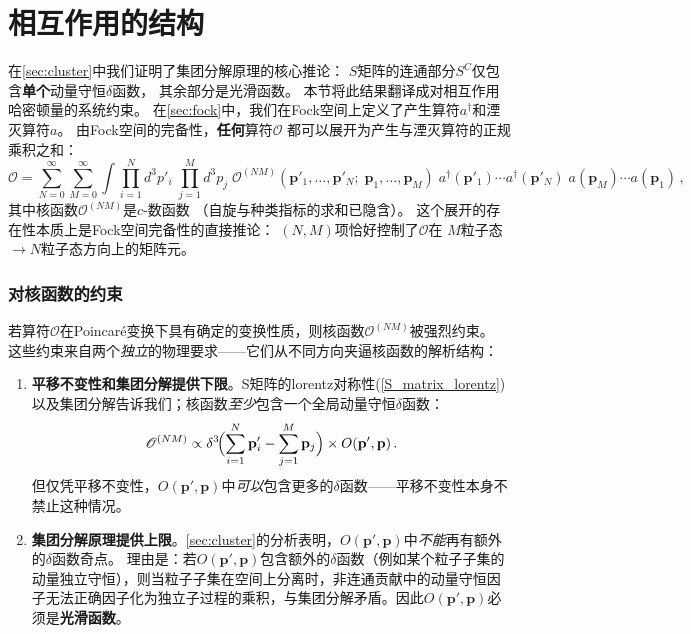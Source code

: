 \section{相互作用的结构}\label{sec:interaction-structure}

在\ref{sec:cluster}中我们证明了集团分解原理的核心推论：
$S$矩阵的连通部分$S^C$仅包含\textbf{单个}动量守恒$\delta$函数，
其余部分是光滑函数。
本节将此结果翻译成对相互作用哈密顿量的系统约束。
在\ref{sec:fock}中，我们在Fock空间上定义了产生算符$a^\dagger$和湮灭算符$a$。
由Fock空间的完备性，\textbf{任何}算符$\mathscr{O}$
都可以展开为产生与湮灭算符的正规乘积之和：
\begin{equation}\label{eq:opexpand}
\mathscr{O} = \sum_{N=0}^{\infty}\sum_{M=0}^{\infty}
\int\prod_{i=1}^{N}d^3p'_i\;\prod_{j=1}^{M}d^3p_j\;
\mathscr{O}^{(NM)}(\boldsymbol{p}'_1,\ldots,\boldsymbol{p}'_N;\;
\boldsymbol{p}_1,\ldots,\boldsymbol{p}_M)\;
a^\dagger(\boldsymbol{p}'_1)\cdots a^\dagger(\boldsymbol{p}'_N)\;
a(\boldsymbol{p}_M)\cdots a(\boldsymbol{p}_1)\,,
\end{equation}
其中核函数$\mathscr{O}^{(NM)}$是$c$-数函数
（自旋与种类指标的求和已隐含）。
这个展开的存在性本质上是Fock空间完备性的直接推论：
$(N,M)$项恰好控制了$\mathscr{O}$在
$M$粒子态$\to N$粒子态方向上的矩阵元。


\subsubsection*{对核函数的约束}

若算符$\mathscr{O}$在Poincar\'e变换下具有确定的变换性质，则核函数$\mathscr{O}^{(NM)}$被强烈约束。
这些约束来自两个\emph{独立}的物理要求——它们从不同方向夹逼核函数的解析结构：

\begin{enumerate}
    \item \textbf{平移不变性和集团分解提供下限}。S矩阵的lorentz对称性(\ref{S_matrix_lorentz})以及集团分解告诉我们；核函数\emph{至少}包含一个全局动量守恒$\delta$函数：
    \begin{equation}\label{eq:single-delta}
        \mathscr{O}^{(NM)} \propto \delta^3\!\Bigl(\sum_{i=1}^{N}\mathbf{p}_i' - \sum_{j=1}^{M}\mathbf{p}_j\Bigr)
        \times O(\mathbf{p}',\mathbf{p})\,.
    \end{equation}
    但仅凭平移不变性，$O(\mathbf{p}',\mathbf{p})$中\emph{可以}包含更多的$\delta$函数——平移不变性本身不禁止这种情况。

    \item \textbf{集团分解原理提供上限}。\ref{sec:cluster}的分析表明，$O(\mathbf{p}',\mathbf{p})$中\emph{不能}再有额外的$\delta$函数奇点。
    理由是：若$O(\mathbf{p}',\mathbf{p})$包含额外的$\delta$函数（例如某个粒子子集的动量独立守恒），则当粒子子集在空间上分离时，非连通贡献中的动量守恒因子无法正确因子化为独立子过程的乘积，与集团分解矛盾。因此$O(\mathbf{p}',\mathbf{p})$必须是\textbf{光滑函数}。
\end{enumerate}

